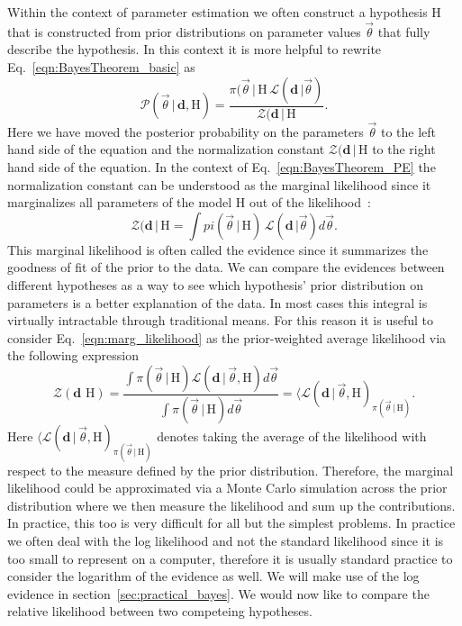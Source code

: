 Within the context of parameter estimation we often construct a hypothesis H that is constructed from prior distributions on parameter values $\vec{\theta}$ that fully describe the hypothesis. In this context it is more helpful to rewrite Eq.~\ref{eqn:BayesTheorem_basic} as
\begin{equation}\label{eqn:BayesTheorem_PE}
   \mathcal{P}(\vec{\theta} \, | \, \mathbf{d}, \mathrm{H}) = \frac{\pi(\vec{\theta} \, | \, \mathrm{H} \, \mathcal{L}(\mathbf{d} \, | \vec{\theta})}
                                                                   {\mathcal{Z}(\mathbf{d} \, | \, \mathrm{H}}.
\end{equation} 
Here we have moved the posterior probability on the parameters $\vec{\theta}$ to the left hand side of the equation and the normalization constant $\mathcal{Z}(\mathbf{d} \, | \, \mathrm{H}$ to the right hand side of the equation. In the context of Eq.~\ref{eqn:BayesTheorem_PE} the normalization constant can be understood as the marginal likelihood since it marginalizes all parameters of the model H out of the likelihood~\cite{hobson2010bayesian}:
\begin{equation}\label{eqn:marg_likelihood}
    \mathcal{Z}(\mathbf{d} \, | \, \mathrm{H} = \int pi(\vec{\theta} \, | \, \mathrm{H}) \, \mathcal{L}(\mathbf{d} \, | \vec{\theta}) d\vec{\theta}.
\end{equation} 
This marginal likelihood is often called the evidence since it summarizes the goodness of fit of the prior to the data. We can compare the evidences between different hypotheses as a way to see which hypothesis' prior distribution on parameters is a better explanation of the data. In most cases this integral is virtually intractable through traditional means. For this reason it is useful to consider Eq.~\ref{eqn:marg_likelihood} as the prior-weighted average likelihood via the following expression
\begin{equation}
    \mathcal{Z}(\mathbf{d} \, \, \mathrm{H}) = \frac{\int \pi(\vec{\theta}\, | \, \mathrm{H}) \mathcal{L}(\mathbf{d} \, | \, \vec{\theta}, \mathrm{H}) d\vec{\theta}}
                                                    {\int \pi(\vec{\theta} \, | \, \mathrm{H}) d\vec{\theta}} = \langle \mathcal{L}(\mathbf{d} \, | \, \vec{\theta}, \mathrm{H})_{\pi(\vec{\theta} \, | \, \mathrm{H})}.
\end{equation}
Here $\langle \mathcal{L}(\mathbf{d} \, | \, \vec{\theta}, \mathrm{H})_{\pi(\vec{\theta} \, | \, \mathrm{H})}$ denotes taking the average of the likelihood with respect to the measure defined by the prior distribution. Therefore, the marginal likelihood could be approximated via a Monte Carlo simulation across the prior distribution where we then measure the likelihood and sum up the contributions. In practice, this too is very difficult for all but the simplest problems. In practice we often deal with the log likelihood and not the standard likelihood since it is too small to represent on a computer, therefore it is usually standard practice to consider the logarithm of the evidence as well. We will make use of the log evidence in section~\ref{sec:practical_bayes}. We would now like to compare the relative likelihood between two competeing hypotheses. 

